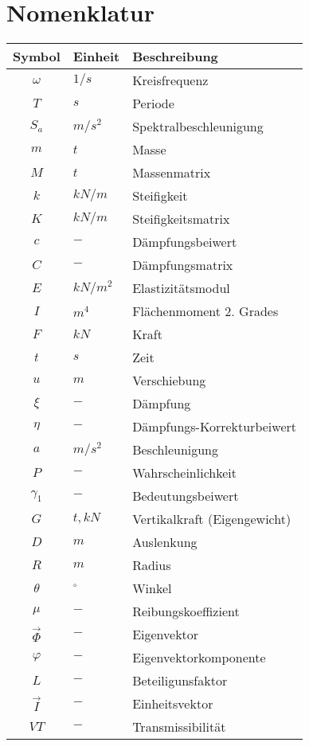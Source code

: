 \cleardoublepage
{}
{}

\chapter*{Nomenklatur}

\begin{longtable}{cp{3cm}p{8cm}}
\hline
Symbol       & Einheit & Beschreibung \\
\hline\hline
$\omega$     & $1/s$   & Kreisfrequenz\\
$T$          & $s$     & Periode      \\
$S_a$        & $m/s^2$ & Spektralbeschleunigung \\
$m$          & $t$     & Masse        \\
$M$          & $t$     & Massenmatrix \\
$k$          & $kN/m$  & Steifigkeit  \\
$K$          & $kN/m$  & Steifigkeitsmatrix \\
$c$          & $-$     & Dämpfungsbeiwert \\
$C$          & $-$     & Dämpfungsmatrix \\
$E$          & $kN/m^2$& Elastizitätsmodul \\
$I$          & $m^4$   & Flächenmoment 2. Grades \\
$F$          & $kN$    & Kraft        \\
$t$          & $s$     & Zeit         \\
$u$          & $m$     & Verschiebung \\
$\xi$        & $-$     & Dämpfung     \\
$\eta$       & $-$     & Dämpfungs-Korrekturbeiwert \\
$a$          & $m/s^2$ & Beschleunigung \\
$P$          & $-$     & Wahrscheinlichkeit \\
$\gamma_1$   & $-$     & Bedeutungsbeiwert \\
$G$          & $t, kN$ & Vertikalkraft (Eigengewicht) \\
$D$          & $m$     & Auslenkung \\
$R$          & $m$     & Radius \\
$\theta$     & $^{\circ}$ & Winkel \\
$\mu$        & $-$     & Reibungskoeffizient \\
$\vec{\Phi}$ & $-$     & Eigenvektor \\
$\varphi$       & $-$     & Eigenvektorkomponente \\
$L$          & $-$     & Beteiligunsfaktor \\
$\vec{I}$    & $-$     & Einheitsvektor \\
$VT$         & $-$     & Transmissibilität \\
\hline
\end{longtable}


